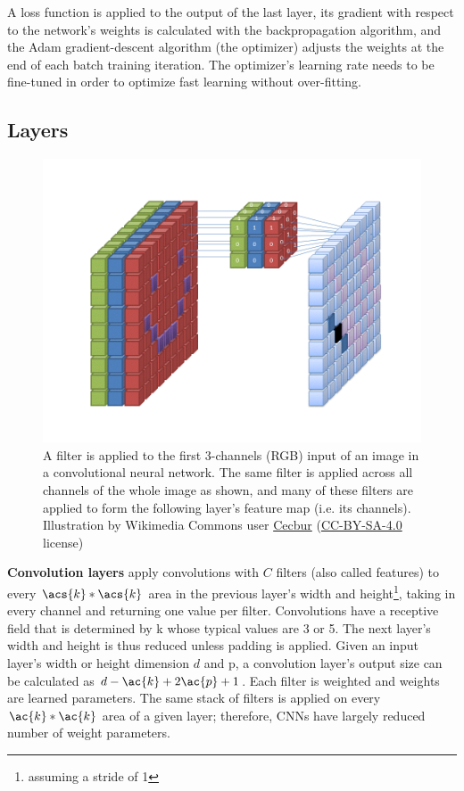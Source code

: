 A loss function is applied to the output of the last layer, its gradient with respect to the network's weights is calculated with the backpropagation algorithm, and the Adam gradient-descent algorithm\cite{adam} (the optimizer) adjusts the weights at the end of each batch training iteration. The optimizer's learning rate needs to be fine-tuned in order to optimize fast learning without over-fitting.

\subsection{Layers}

\begin{figure}
  \begin{center}
    \includegraphics{gfx/Convolutional_Neural_Network_with_Color_Image_Filter.png}
    \caption[Standard convolution]{A filter is applied to the first 3-channels (RGB) input of an image in a convolutional neural network. The same filter is applied across all channels of the whole image as shown, and many of these filters are applied to form the following layer's feature map (i.e. its channels). Illustration by Wikimedia Commons user \href{https://commons.wikimedia.org/wiki/File:Convolutional_Neural_Network_with_Color_Image_Filter.gif}{Cecbur} (\href{https://creativecommons.org/licenses/by-sa/4.0/deed.en}{CC-BY-SA-4.0} license)}
    \label{fig:convolutionfilter}
  \end{center}
\end{figure}

\textbf{Convolution layers} apply convolutions with $C$ filters (also called features) to every $\acs{k}*\acs{k}$ area in the previous layer's width and height\footnote{assuming a stride of 1}, taking in every channel and returning one value per filter. Convolutions have a receptive field that is determined by \ac{k} whose typical values are 3 or 5. The next layer's width and height is thus reduced unless padding is applied. Given an input layer's width or height dimension $d$ and \ac{p}, a convolution layer's output size can be calculated as $d-\ac{k}+2\ac{p}+1$. Each filter is weighted and weights are learned parameters. The same stack of filters is applied on every $\ac{k}*\ac{k}$ area of a given layer; therefore, \acp{CNN} have largely reduced number of weight parameters.

